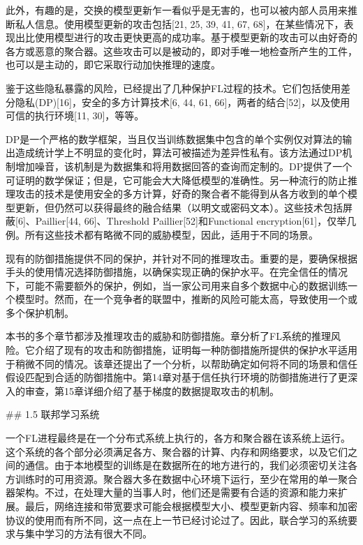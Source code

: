 此外，有趣的是，交换的模型更新乍一看似乎是无害的，也可以被内部人员用来推断私人信息。使用模型更新的攻击包括[21, 25, 39, 41, 67, 68]，在某些情况下，表现出比使用模型进行的攻击更快更高的成功率。基于模型更新的攻击可以由好奇的各方或恶意的聚合器。这些攻击可以是被动的，即对手唯一地检查所产生的工件，也可以是主动的，即它采取行动加快推理的速度。

鉴于这些隐私暴露的风险，已经提出了几种保护FL过程的技术。它们包括使用差分隐私(DP)[16]，安全的多方计算技术[6, 44, 61, 66]，两者的结合[52]，以及使用可信的执行环境[11, 30]，等等。

DP是一个严格的数学框架，当且仅当训练数据集中包含的单个实例仅对算法的输出造成统计学上不明显的变化时，算法可被描述为差异性私有。该方法通过DP机制增加噪音，该机制是为数据集和将用数据回答的查询而定制的。DP提供了一个可证明的数学保证；但是，它可能会大大降低模型的准确性。另一种流行的防止推理攻击的技术是使用安全的多方计算，好奇的聚合者不能得到从各方收到的单个模型更新，但仍然可以获得最终的融合结果（以明文或密码文本）。这些技术包括屏蔽[6]、Paillier[44, 66]、Threshold Paillier[52]和Functional encryption[61]，仅举几例。所有这些技术都有略微不同的威胁模型，因此，适用于不同的场景。

现有的防御措施提供不同的保护，并针对不同的推理攻击。重要的是，要确保根据手头的使用情况选择防御措施，以确保实现正确的保护水平。在完全信任的情况下，可能不需要额外的保护，例如，当一家公司用来自多个数据中心的数据训练一个模型时。然而，在一个竞争者的联盟中，推断的风险可能太高，导致使用一个或多个保护机制。

本书的多个章节都涉及推理攻击的威胁和防御措施。章分析了FL系统的推理风险。它介绍了现有的攻击和防御措施，证明每一种防御措施所提供的保护水平适用于稍微不同的情况。该章还提出了一个分析，以帮助确定如何将不同的场景和信任假设匹配到合适的防御措施中。第14章对基于信任执行环境的防御措施进行了更深入的审查，第15章详细介绍了基于梯度的数据提取攻击的机制。

## 1.5 联邦学习系统

一个FL进程最终是在一个分布式系统上执行的，各方和聚合器在该系统上运行。这个系统的各个部分必须满足各方、聚合器的计算、内存和网络要求，以及它们之间的通信。由于本地模型的训练是在数据所在的地方进行的，我们必须密切关注各方训练时的可用资源。聚合器大多在数据中心环境下运行，至少在常用的单一聚合器架构。不过，在处理大量的当事人时，他们还是需要有合适的资源和能力来扩展。最后，网络连接和带宽要求可能会根据模型大小、模型更新内容、频率和加密协议的使用而有所不同，这一点在上一节已经讨论过了。因此，联合学习的系统要求与集中学习的方法有很大不同。

